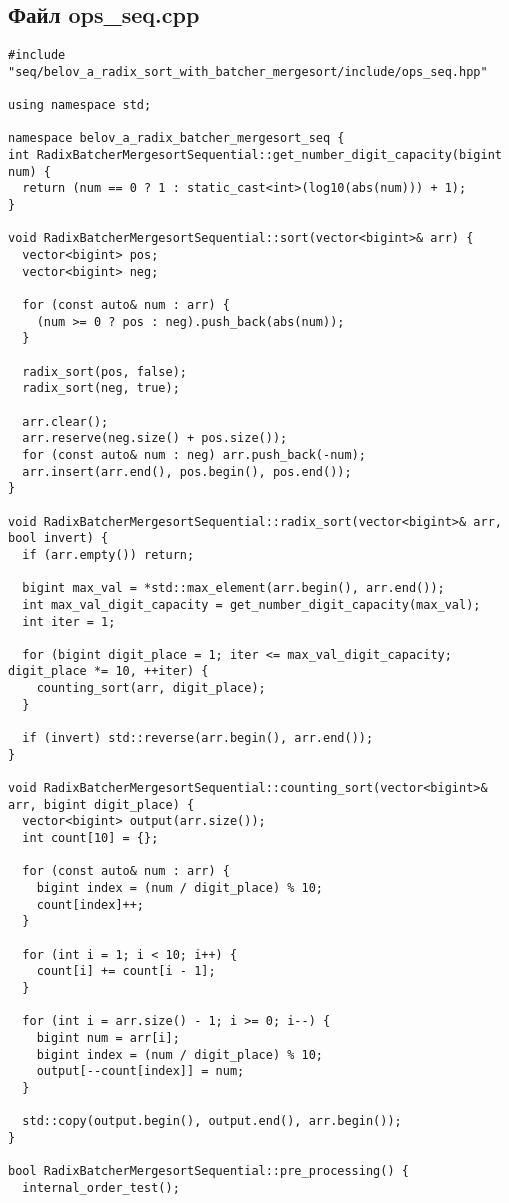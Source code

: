 ﻿\documentclass[a4paper,12pt]{article}
\begin{document}
\subsection*{Файл ops\_seq.cpp}
\begin{lstlisting}
#include "seq/belov_a_radix_sort_with_batcher_mergesort/include/ops_seq.hpp"

using namespace std;

namespace belov_a_radix_batcher_mergesort_seq {
int RadixBatcherMergesortSequential::get_number_digit_capacity(bigint num) {
  return (num == 0 ? 1 : static_cast<int>(log10(abs(num))) + 1);
}

void RadixBatcherMergesortSequential::sort(vector<bigint>& arr) {
  vector<bigint> pos;
  vector<bigint> neg;

  for (const auto& num : arr) {
    (num >= 0 ? pos : neg).push_back(abs(num));
  }

  radix_sort(pos, false);
  radix_sort(neg, true);

  arr.clear();
  arr.reserve(neg.size() + pos.size());
  for (const auto& num : neg) arr.push_back(-num);
  arr.insert(arr.end(), pos.begin(), pos.end());
}

void RadixBatcherMergesortSequential::radix_sort(vector<bigint>& arr, bool invert) {
  if (arr.empty()) return;

  bigint max_val = *std::max_element(arr.begin(), arr.end());
  int max_val_digit_capacity = get_number_digit_capacity(max_val);
  int iter = 1;

  for (bigint digit_place = 1; iter <= max_val_digit_capacity; digit_place *= 10, ++iter) {
    counting_sort(arr, digit_place);
  }

  if (invert) std::reverse(arr.begin(), arr.end());
}

void RadixBatcherMergesortSequential::counting_sort(vector<bigint>& arr, bigint digit_place) {
  vector<bigint> output(arr.size());
  int count[10] = {};

  for (const auto& num : arr) {
    bigint index = (num / digit_place) % 10;
    count[index]++;
  }

  for (int i = 1; i < 10; i++) {
    count[i] += count[i - 1];
  }

  for (int i = arr.size() - 1; i >= 0; i--) {
    bigint num = arr[i];
    bigint index = (num / digit_place) % 10;
    output[--count[index]] = num;
  }

  std::copy(output.begin(), output.end(), arr.begin());
}

bool RadixBatcherMergesortSequential::pre_processing() {
  internal_order_test();


\end{lstlisting}
\end{document}
